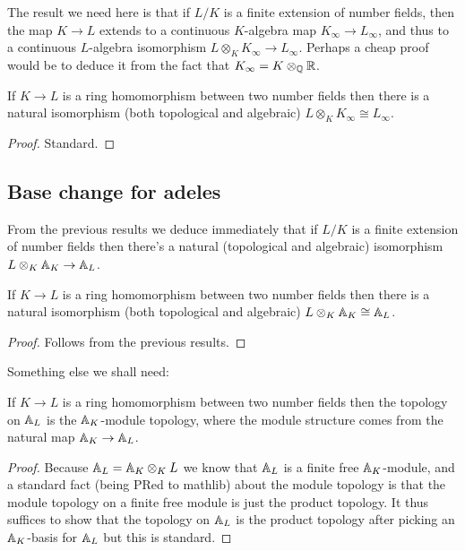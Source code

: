 The result we need here is that if $L/K$ is a finite extension of number fields,
then the map $K\to L$ extends to a continuous $K$-algebra map $K_\infty\to L_\infty$,
and thus to a continuous $L$-algebra isomorphism $L\otimes_KK_\infty\to L_\infty$.
Perhaps a cheap proof would be to deduce it from the fact that $K_\infty=K\otimes_{\mathbb{Q}}\mathbb{R}$.

\begin{theorem}
  \label{NumberField.InfiniteAdeleRing.baseChangeEquiv}
  If $K\to L$ is a ring homomorphism between two number fields then there is a natural isomorphism
  (both topological and algebraic) $L\otimes_KK_\infty\cong L_\infty$.
\end{theorem}
\begin{proof}
  Standard.
\end{proof}

\subsection{Base change for adeles}

From the previous results we deduce immediately that if $L/K$ is a finite extension
of number fields then there's a natural (topological and algebraic) isomorphism
$L\otimes_K\mathbb{A}_K\to \mathbb{A}_L$.

\begin{theorem}
  \label{NumberField.AdeleRing.baseChangeEquiv}
  If $K\to L$ is a ring homomorphism between two number fields then there is a natural isomorphism
  (both topological and algebraic) $L\otimes_K\mathbb{A}_K\cong\mathbb{A}_L$.
\end{theorem}
\begin{proof}
  Follows from the previous results.
\end{proof}

Something else we shall need:

\begin{theorem}
  \label{NumberField.AdeleRing.baseChange_moduleTopology}
  If $K\to L$ is a ring homomorphism between two number fields then the topology on $\mathbb{A}_L$
  is the $\mathbb{A}_K$-module topology, where the module structure comes from the
  natural map $\mathbb{A}_K\to\mathbb{A}_L$.
\end{theorem}
\begin{proof}
  Because $\mathbb{A}_L=\mathbb{A}_K\otimes_{K}L$ we know that $\mathbb{A}_L$ is a finite free $\mathbb{A}_K$-module,
  and a standard fact (being PRed to mathlib) about the module topology is that the module topology
  on a finite free module is just the product topology. It thus suffices to show that
  the topology on $\mathbb{A}_L$ is the product topology after picking an $\mathbb{A}_K$-basis for $\mathbb{A}_L$
  but this is standard.
\end{proof}

